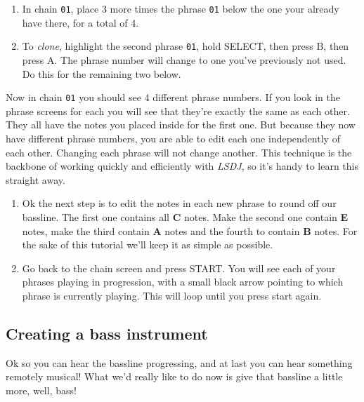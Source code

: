 \documentclass[]{article}
\newcommand{\buttonStyle}[1]{\textsf{#1}\xspace}
\newcommand{\bA}{\buttonStyle{A}}
\newcommand{\bB}{\buttonStyle{B}}
\newcommand{\bStart}{\buttonStyle{{START}}}
\newcommand{\bSelect}{\buttonStyle{{SELECT}}}
\newcommand{\note}[1]{\textbf{#1}\xspace}
\newcommand{\nb}[1]{\texttt{#1}\xspace}
\newcommand{\lsdj}{\textit{LSDJ}\xspace}
\begin{document}
\begin{enumerate}[resume]

\item In chain \nb{01}, place 3 more times the phrase \nb{01} below the one your already have there, for a total of 4.

\item To \textit{clone}, highlight the second phrase \nb{01}, hold \bSelect, then press \bB, then press \bA. The phrase number will change to one you've previously not used. Do this for the remaining two below.

\end{enumerate}

Now in chain \nb{01} you should see 4 different phrase numbers. If you look in the phrase screens for each you will see that they're exactly the same as each other. They all have the notes you placed inside for the first one. But because they now have different phrase numbers, you are able to edit each one independently of each other. Changing each phrase will not change another. This technique is the backbone of working quickly and efficiently with \lsdj, so it's handy to learn this straight away.


\begin{enumerate}[resume]

\item 
Ok the next step is to edit the notes in each new phrase to round off our bassline.
The first one contains all \note{C} notes. Make the second one contain \note{E} notes, make the third contain \note{A} notes and the fourth to contain \note{B} notes. For the sake of this tutorial we'll keep it as simple as possible.

\item Go back to the chain screen and press \bStart. You will see each of your phrases playing in progression, with a small black arrow pointing to which phrase is currently playing. This will loop until you press start again.

\end{enumerate}


\subsection{Creating a bass instrument}

Ok so you can hear the bassline progressing, and at last you can hear something remotely musical! What we'd really like to do now is give that bassline a little more, well, bass!
\end{document}
